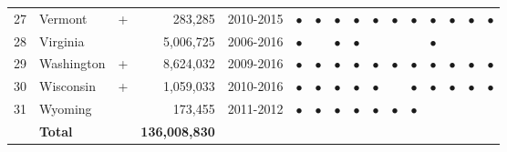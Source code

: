 \begin{table}[ht]
\begin{tabular}{llcrcccccccccccc}
  27 & Vermont & + &     283,285 & 2010-2015 & $\bullet$ & $\bullet$ & $\bullet$ & $\bullet$ & $\bullet$ & $\bullet$ & $\bullet$ & $\bullet$ & $\bullet$ & $\bullet$ & $\bullet$ \\ 
  28 & Virginia &  &   5,006,725 & 2006-2016 & $\bullet$ &  & $\bullet$ & $\bullet$ &  &  &  & $\bullet$ &  &  &  \\ 
  29 & Washington & + &   8,624,032 & 2009-2016 & $\bullet$ & $\bullet$ & $\bullet$ & $\bullet$ & $\bullet$ & $\bullet$ & $\bullet$ & $\bullet$ & $\bullet$ & $\bullet$ & $\bullet$ \\ 
  30 & Wisconsin & + &   1,059,033 & 2010-2016 & $\bullet$ & $\bullet$ & $\bullet$ & $\bullet$ & $\bullet$ &  & $\bullet$ & $\bullet$ & $\bullet$ & $\bullet$ & $\bullet$ \\ 
  31 & Wyoming &  &     173,455 & 2011-2012 & $\bullet$ & $\bullet$ & $\bullet$ & $\bullet$ & $\bullet$ & $\bullet$ & $\bullet$ &  &  &  &  \\ 
   & \textbf{Total} &  & \textbf{136,008,830} &  &  &  &  &  &  &  &  &  &  &  &  \\ 
   \hline
\end{tabular}
\end{table}

